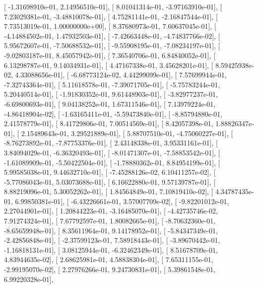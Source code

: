 \documentclass{article}
\begin{document}
       [ -1.31698910e-01,   2.14956510e-01],
       [  8.01041314e-01,  -3.97163910e-01],
       [  7.23029381e-01,  -3.48810078e-01],
       [  4.75281141e-01,  -2.16847544e-01],
       [  7.73513019e-01,   1.00000000e+00],
       [  8.37680973e-01,   7.60637045e-01],
       [ -4.14884502e-01,   1.47932503e-01],
       [ -7.42663448e-01,  -4.74837766e-02],
       [  5.95672607e-01,  -7.50688532e-01],
       [ -9.55908195e-01,  -7.08234197e-01],
       [ -9.02803187e-01,   8.45057942e-01],
       [  7.36540706e-01,   6.84840052e-01],
       [  6.13298787e-01,   9.14034931e-01],
       [  4.47167338e-01,   3.45628201e-01],
       [  8.59425938e-02,   4.33088656e-01],
       [ -6.68773124e-02,   4.44299099e-01],
       [  7.57699944e-01,  -7.32743364e-01],
       [  5.11618578e-01,  -7.39071705e-01],
       [ -5.75783244e-01,   5.20440514e-01],
       [ -1.91830352e-01,   9.61448903e-01],
       [ -3.82977237e-01,  -6.69800693e-01],
       [  9.04138252e-01,   1.67311546e-01],
       [  7.13979224e-01,  -4.86418904e-02],
       [ -1.63165411e-01,  -5.59473840e-01],
       [ -8.85794880e-01,   2.41578779e-01],
       [  8.41729806e-01,   7.00514569e-01],
       [  8.42057398e-01,   1.88826347e-01],
       [  2.15489643e-01,   3.29521889e-01],
       [  5.88707510e-01,  -4.75060227e-01],
       [ -8.76273892e-01,  -7.87753376e-01],
       [  2.43148338e-01,   3.95331161e-01],
       [  3.84094029e-01,  -6.36320493e-01],
       [ -8.01471307e-01,  -7.58853542e-01],
       [ -1.61089909e-01,  -5.50422504e-01],
       [ -1.78880362e-01,   8.84954199e-01],
       [  5.99585038e-01,   9.44632710e-01],
       [ -7.45288126e-02,   6.10411257e-02],
       [ -5.77086043e-01,   5.03073688e-01],
       [  6.16622880e-01,   9.57139787e-01],
       [  8.88219096e-01,   5.30052262e-01],
       [  1.84564849e-01,   7.10819410e-02],
       [  4.34787435e-01,   6.99850381e-01],
       [ -6.43226661e-01,   3.57007709e-02],
       [ -9.82201012e-01,   2.27044901e-01],
       [  1.20844223e-01,  -3.16485070e-01],
       [ -4.42735746e-02,   7.91274324e-01],
       [  7.67792597e-01,   1.80082665e-01],
       [ -8.70632360e-01,  -8.65659948e-01],
       [  8.35611964e-01,   9.14178952e-01],
       [ -5.84347349e-01,  -2.42856848e-01],
       [ -2.37599123e-01,   7.58918443e-01],
       [ -3.89670442e-01,  -1.16818131e-01],
       [  3.08125944e-01,  -6.32462349e-01],
       [  8.51678709e-01,   4.83944635e-02],
       [  2.68625981e-01,   4.58838304e-01],
       [  7.65311155e-01,  -2.99195070e-02],
       [  2.27976266e-01,   9.24730831e-01],
       [  5.39861548e-01,   6.99220328e-01],
\end{document}
